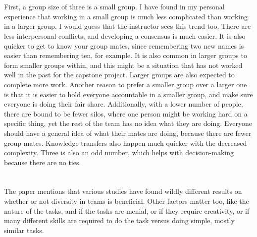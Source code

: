 \documentclass[letterpaper,12pt]{article}
\begin{document}
  \section{}
  First, a group size of three is a small group. I have found in my personal
experience that working in a small group is much less complicated than working
in a larger group. I would guess that the instructor sees this trend too.  There
are less interpersonal conflicts, and developing a consensus is much easier. It
is also quicker to get to know your group mates, since remembering two new names
is easier than remembering ten, for example. It is also common in larger groups
to form smaller groups within, and this might be a situation that has not worked
well in the past for the capstone project. Larger groups are also expected to
complete more work. Another reason to prefer a smaller group over a larger one
is that it is easier to hold everyone accountable in a smaller group, and make
sure everyone is doing their fair share.  Additionally, with a lower number of
people, there are bound to be fewer silos, where one person might be working hard
on a specific thing, yet the rest of the team has no idea what they are doing.
Everyone should have a general idea of what their mates are doing,  because
there are fewer group mates.  Knowledge transfers also happen much quicker with
the decreased complexity. Three is also an odd number, which helps with decision-making because there are no ties.

\section{}
The paper mentions that various studies have found wildly different results on
whether or not diversity in teams is beneficial. Other factors matter too, like
the nature of the tasks, and if the tasks are menial, or if they require
creativity, or if many different skills are required to do the task versus doing
simple, mostly similar tasks.
\end{document}
